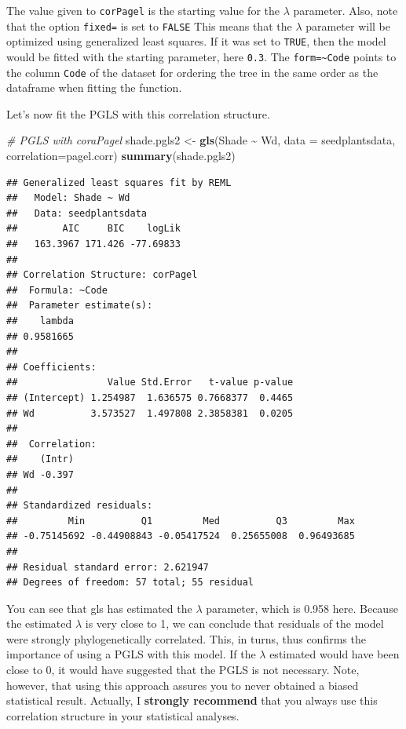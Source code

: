 \documentclass[
]{book}
\newenvironment{Shaded}{\begin{snugshade}}{\end{snugshade}}
\newcommand{\AttributeTok}[1]{\textcolor[rgb]{0.13,0.29,0.53}{#1}}
\newcommand{\CommentTok}[1]{\textcolor[rgb]{0.56,0.35,0.01}{\textit{#1}}}
\newcommand{\FunctionTok}[1]{\textcolor[rgb]{0.13,0.29,0.53}{\textbf{#1}}}
\newcommand{\NormalTok}[1]{#1}
\newcommand{\OtherTok}[1]{\textcolor[rgb]{0.56,0.35,0.01}{#1}}
\newcommand{\SpecialCharTok}[1]{\textcolor[rgb]{0.81,0.36,0.00}{\textbf{#1}}}
\begin{document}
The value given to \texttt{corPagel} is the starting value for the \(\lambda\) parameter. Also, note that the option \texttt{fixed=} is set to \texttt{FALSE} This means that the \(\lambda\) parameter will be optimized using generalized least squares. If it was set to \texttt{TRUE}, then the model would be fitted with the starting parameter, here \texttt{0.3}. The \texttt{form=\textasciitilde{}Code} points to the column \texttt{Code} of the dataset for ordering the tree in the same order as the dataframe when fitting the function.

Let's now fit the PGLS with this correlation structure.

\begin{Shaded}
\begin{Highlighting}[]
\CommentTok{\# PGLS with coraPagel}
\NormalTok{shade.pgls2 }\OtherTok{\textless{}{-}} \FunctionTok{gls}\NormalTok{(Shade }\SpecialCharTok{\textasciitilde{}}\NormalTok{ Wd, }\AttributeTok{data =}\NormalTok{ seedplantsdata, }\AttributeTok{correlation=}\NormalTok{pagel.corr)}
\FunctionTok{summary}\NormalTok{(shade.pgls2)}
\end{Highlighting}
\end{Shaded}

\begin{verbatim}
## Generalized least squares fit by REML
##   Model: Shade ~ Wd 
##   Data: seedplantsdata 
##        AIC     BIC    logLik
##   163.3967 171.426 -77.69833
## 
## Correlation Structure: corPagel
##  Formula: ~Code 
##  Parameter estimate(s):
##    lambda 
## 0.9581665 
## 
## Coefficients:
##                Value Std.Error   t-value p-value
## (Intercept) 1.254987  1.636575 0.7668377  0.4465
## Wd          3.573527  1.497808 2.3858381  0.0205
## 
##  Correlation: 
##    (Intr)
## Wd -0.397
## 
## Standardized residuals:
##         Min          Q1         Med          Q3         Max 
## -0.75145692 -0.44908843 -0.05417524  0.25655008  0.96493685 
## 
## Residual standard error: 2.621947 
## Degrees of freedom: 57 total; 55 residual
\end{verbatim}

You can see that gls has estimated the \(\lambda\) parameter, which is 0.958 here. Because the estimated \(\lambda\) is very close to 1, we can conclude that residuals of the model were strongly phylogenetically correlated. This, in turns, thus confirms the importance of using a PGLS with this model. If the \(\lambda\) estimated would have been close to 0, it would have suggested that the PGLS is not necessary. Note, however, that using this approach assures you to never obtained a biased statistical result. Actually, I \textbf{strongly recommend} that you always use this correlation structure in your statistical analyses.
\end{document}

